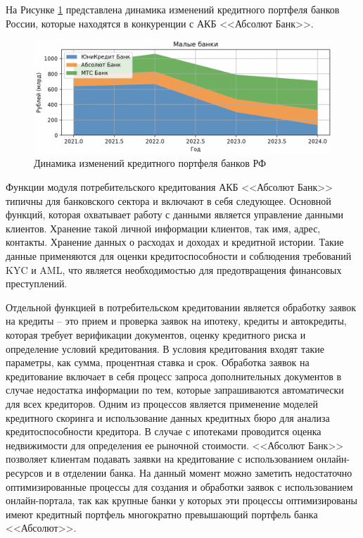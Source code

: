 \documentclass[14pt, a4paper]{extarticle}
\begin{document}
На Рисунке \ref{fig:кредитный_портфель_банков_малые} представлена динамика
изменений кредитного портфеля банков России, которые находятся в конкуренции с
АКБ <<Абсолют Банк>>.

\begin{figure}[H]
	\centering
	\includegraphics[width=\textwidth]{кредитный_портфель_банков_малые}
	\caption{Динамика изменений кредитного портфеля банков РФ}
	\label{fig:кредитный_портфель_банков_малые}
\end{figure}

Функции модуля потребительского кредитования АКБ <<Абсолют Банк>> типичны для
банковского сектора и включают в себя следующее. Основной функций, которая
охватывает работу с данными является управление данными клиентов. Хранение
такой личной информации клиентов, так имя, адрес, контакты. Хранение данных о
расходах и доходах и кредитной истории. Такие данные применяются для оценки
кредитоспособности и соблюдения требований KYC\cite{kyc} и AML, что
является
необходимостью для предотвращения финансовых преступлений.

Отдельной функцией в потребительском кредитовании является обработку заявок на
кредиты -- это прием и проверка заявок на ипотеку, кредиты и автокредиты,
которая требует верификации документов, оценку кредитного риска и определение
условий кредитования. В условия кредитования входят такие параметры, как сумма,
процентная ставка и срок. Обработка заявок на кредитование включает в себя
процесс запроса дополнительных документов в случае недостатка информации по
тем, которые запрашиваются автоматически для всех кредиторов. Одним из
процессов является применение моделей кредитного скоринга и использование
данных кредитных бюро для анализа кредитоспособности кредитора. В случае с
ипотеками проводится оценка недвижимости для определения ее рыночной стоимости.
<<Абсолют Банк>> позволяет клиентам подавать заявки на кредитование с
использованием онлайн-ресурсов и в отделении банка. На данный момент можно
заметить недостаточно оптимизированные процессы для создания и обработки заявок
с использованием онлайн-портала, так как крупные банки у которых эти процессы
оптимизированы имеют кредитный портфель многократно превышающий портфель банка
<<Абсолют>>.
\end{document}
